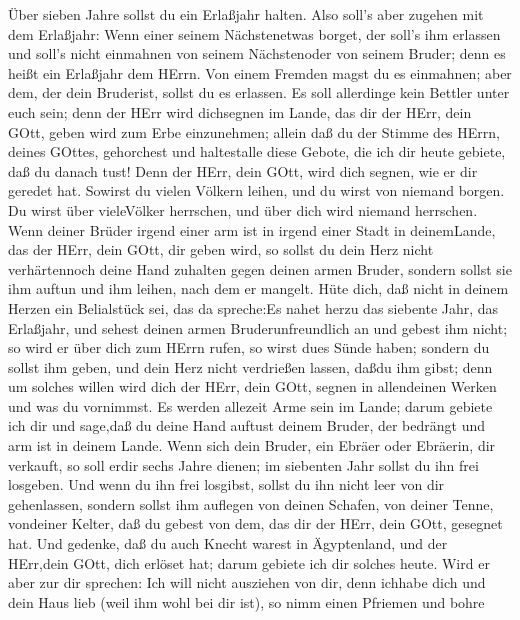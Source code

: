  Über sieben Jahre sollst du ein Erlaßjahr halten.
 Also soll's aber zugehen mit dem Erlaßjahr: Wenn einer
seinem Nächstenetwas borget, der soll's ihm erlassen und soll's nicht
einmahnen von seinem Nächstenoder von seinem Bruder; denn es heißt ein
Erlaßjahr dem HErrn.  Von einem Fremden magst du es
einmahnen; aber dem, der dein Bruderist, sollst du es erlassen.
 Es soll allerdinge kein Bettler unter euch sein; denn der
HErr wird dichsegnen im Lande, das dir der HErr, dein GOtt, geben wird
zum Erbe einzunehmen;  allein daß du der Stimme des HErrn,
deines GOttes, gehorchest und haltestalle diese Gebote, die ich dir
heute gebiete, daß du danach tust!  Denn der HErr, dein
GOtt, wird dich segnen, wie er dir geredet hat. Sowirst du vielen
Völkern leihen, und du wirst von niemand borgen. Du wirst über
vieleVölker herrschen, und über dich wird niemand herrschen.
 Wenn deiner Brüder irgend einer arm ist in irgend einer
Stadt in deinemLande, das der HErr, dein GOtt, dir geben wird, so sollst
du dein Herz nicht verhärtennoch deine Hand zuhalten gegen deinen armen
Bruder,  sondern sollst sie ihm auftun und ihm leihen, nach
dem er mangelt.  Hüte dich, daß nicht in deinem Herzen ein
Belialstück sei, das da spreche:Es nahet herzu das siebente Jahr, das
Erlaßjahr, und sehest deinen armen Bruderunfreundlich an und gebest ihm
nicht; so wird er über dich zum HErrn rufen, so wirst dues Sünde haben;
 sondern du sollst ihm geben, und dein Herz nicht
verdrießen lassen, daßdu ihm gibst; denn um solches willen wird dich der
HErr, dein GOtt, segnen in allendeinen Werken und was du vornimmst.
 Es werden allezeit Arme sein im Lande; darum gebiete ich
dir und sage,daß du deine Hand auftust deinem Bruder, der bedrängt und
arm ist in deinem Lande.  Wenn sich dein Bruder, ein Ebräer
oder Ebräerin, dir verkauft, so soll erdir sechs Jahre dienen; im
siebenten Jahr sollst du ihn frei losgeben.  Und wenn du
ihn frei losgibst, sollst du ihn nicht leer von dir gehenlassen,
 sondern sollst ihm auflegen von deinen Schafen, von deiner
Tenne, vondeiner Kelter, daß du gebest von dem, das dir der HErr, dein
GOtt, gesegnet hat.  Und gedenke, daß du auch Knecht warest
in Ägyptenland, und der HErr,dein GOtt, dich erlöset hat; darum gebiete
ich dir solches heute.  Wird er aber zur dir sprechen: Ich
will nicht ausziehen von dir, denn ichhabe dich und dein Haus lieb (weil
ihm wohl bei dir ist),  so nimm einen Pfriemen und bohre
